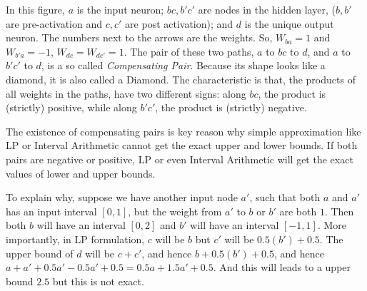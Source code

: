 \documentclass{llncs}
\begin{document}
\vspace*{2ex}

In this figure, $a$ is the input neuron; $bc,b'c'$ are nodes in the hidden layer, ($b,b'$ are pre-activation and $c,c'$ are post activation); and $d$ is the unique output neuron. The numbers next to the arrows are the weights. So, $W_{ba}=1$ and $W_{b'a}=-1$, $W_{dc}=W_{dc'}=1$. The pair of these two paths, $a$ to $bc$ to $d$, and $a$ to $b'c'$ to $d$, is a so called \emph{Compensating Pair}. Because its shape looks like a diamond, it is also called a Diamond. The characteristic is that, the products of all weights in the paths, have two different signs: along $bc$, the product is (strictly) positive, while along $b'c'$, the product is (strictly) negative. 

The existence of compensating pairs is key reason why simple approximation like LP or Interval Arithmetic cannot get the exact upper and lower bounds. If both pairs are negative or positive, LP or even Interval Arithmetic will get the exact values of lower and upper bounds.


To explain why, suppose we have another input node $a'$, such that both $a$ and $a'$ has an input interval $[0,1]$, but the weight from $a'$ to $b$ or $b'$ are both $1$. Then both $b$ will have an interval $[0,2]$ and $b'$ will have an interval $[-1,1]$. More importantly, in LP formulation, $c$ will be $b$ but $c'$ will be $0.5(b')+0.5$. The upper bound of $d$ will be $c+c'$, and hence $b+0.5(b')+0.5$, and hence $a+a'+0.5a'-0.5a'+0.5=0.5a+1.5a'+0.5$. And this will leads to a upper bound $2.5$ but this is not exact.
\end{document}
